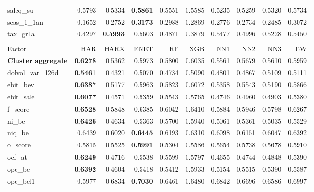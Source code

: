 \begin{longtable}{>{\raggedright\arraybackslash}p{2.6cm}rrrrrrrrr}
saleq\_su & 0.5793 & 0.5334 & \textbf{\cellcolor{blue!10}0.5861} & 0.5551 & 0.5585 & 0.5235 & 0.5259 & 0.5320 & 0.5734 \\
seas\_1\_1an & 0.1652 & \cellcolor{blue!10}0.2752 & \textbf{\cellcolor{blue!10}0.3173} & \cellcolor{blue!10}0.2988 & \cellcolor{blue!10}0.2869 & \cellcolor{blue!10}0.2776 & \cellcolor{blue!10}0.2734 & \cellcolor{blue!10}0.2485 & \cellcolor{blue!10}0.3072 \\
tax\_gr1a & 0.4297 & \textbf{\cellcolor{blue!10}0.5993} & \cellcolor{blue!10}0.5603 & \cellcolor{blue!10}0.4871 & 0.3879 & \cellcolor{blue!10}0.5477 & \cellcolor{blue!10}0.4996 & \cellcolor{blue!10}0.5228 & \cellcolor{blue!10}0.5450 \\
\hline
\multicolumn{10}{@{}l}{\textit{Panel H. Profitability}} \\
\hline
Factor & HAR & HARX & ENET & RF & XGB & NN1 & NN2 & NN3 & EW \\
\hline
\textbf{Cluster aggregate} & \textbf{0.6278} & 0.5362 & 0.5973 & 0.5800 & 0.6035 & 0.5561 & 0.5679 & 0.5610 & 0.5959 \\
dolvol\_var\_126d & \textbf{0.5461} & 0.4321 & 0.5070 & 0.4734 & 0.5090 & 0.4801 & 0.4867 & 0.5109 & 0.5111 \\
ebit\_bev & \textbf{0.6387} & 0.5177 & 0.5963 & 0.5823 & 0.6072 & 0.5358 & 0.5543 & 0.5190 & 0.5866 \\
ebit\_sale & \textbf{0.6077} & 0.4571 & 0.5359 & 0.5543 & 0.5765 & 0.4746 & 0.4960 & 0.4903 & 0.5380 \\
f\_score & \textbf{0.6528} & 0.5848 & 0.6385 & 0.6042 & 0.6410 & 0.5884 & 0.5946 & 0.5798 & 0.6267 \\
ni\_be & \textbf{0.6426} & 0.4634 & 0.5363 & 0.5700 & 0.5940 & 0.5061 & 0.5361 & 0.5035 & 0.5529 \\
niq\_be & 0.6439 & 0.6020 & \textbf{\cellcolor{blue!10}0.6445} & 0.6193 & 0.6310 & 0.6098 & 0.6151 & 0.6047 & 0.6392 \\
o\_score & 0.5815 & 0.5525 & \textbf{\cellcolor{blue!10}0.5991} & 0.5304 & 0.5586 & 0.5654 & 0.5738 & 0.5678 & \cellcolor{blue!10}0.5910 \\
ocf\_at & \textbf{0.6249} & 0.4716 & 0.5538 & 0.5599 & 0.5797 & 0.4655 & 0.4744 & 0.4848 & 0.5390 \\
ope\_be & \textbf{0.6392} & 0.4604 & 0.5418 & 0.5412 & 0.5933 & 0.5154 & 0.5515 & 0.5390 & 0.5587 \\
ope\_bel1 & 0.5977 & \cellcolor{blue!10}0.6834 & \textbf{\cellcolor{blue!10}0.7030} & \cellcolor{blue!10}0.6461 & \cellcolor{blue!10}0.6480 & \cellcolor{blue!10}0.6842 & \cellcolor{blue!10}0.6696 & \cellcolor{blue!10}0.6586 & \cellcolor{blue!10}0.6997 \\

\end{longtable}
